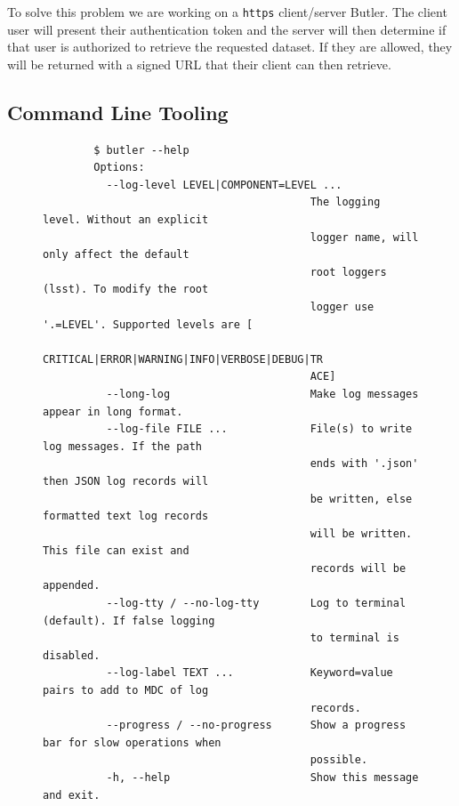 \documentclass[]{spie}
\begin{document}
To solve this problem we are working on a \texttt{https} client/server Butler\cite{DMTN-176}.
The client user will present their authentication token and the server will then determine if that user is authorized to retrieve the requested dataset.
If they are allowed, they will be returned with a signed URL that their client can then retrieve.

\subsection{Command Line Tooling}

\begin{figure}
    \begin{small}
    \begin{verbatim}
        $ butler --help
        Options:
          --log-level LEVEL|COMPONENT=LEVEL ...
                                          The logging level. Without an explicit
                                          logger name, will only affect the default
                                          root loggers (lsst). To modify the root
                                          logger use '.=LEVEL'. Supported levels are [
                                          CRITICAL|ERROR|WARNING|INFO|VERBOSE|DEBUG|TR
                                          ACE]
          --long-log                      Make log messages appear in long format.
          --log-file FILE ...             File(s) to write log messages. If the path
                                          ends with '.json' then JSON log records will
                                          be written, else formatted text log records
                                          will be written. This file can exist and
                                          records will be appended.
          --log-tty / --no-log-tty        Log to terminal (default). If false logging
                                          to terminal is disabled.
          --log-label TEXT ...            Keyword=value pairs to add to MDC of log
                                          records.
          --progress / --no-progress      Show a progress bar for slow operations when
                                          possible.
          -h, --help                      Show this message and exit.


\end{verbatim}
\end{small}
\end{figure}
\end{document}
